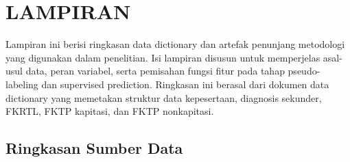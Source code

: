 \cleardoublepage
\appendix
{}

\chapter*{LAMPIRAN}

\setcounter{section}{0}
\setcounter{table}{0}
\setcounter{figure}{0}
\renewcommand{\thesection}{\Alph{section}}
\renewcommand{\thetable}{\thesection.\arabic{table}}
\renewcommand{\thefigure}{\thesection.\arabic{figure}}
\makeatletter
{}
\makeatother

Lampiran ini berisi ringkasan data dictionary dan artefak penunjang metodologi yang digunakan dalam penelitian. Isi lampiran disusun untuk memperjelas asal-usul data, peran variabel, serta pemisahan fungsi fitur pada tahap pseudo-labeling dan supervised prediction. Ringkasan ini berasal dari dokumen data dictionary yang memetakan struktur data kepesertaan, diagnosis sekunder, FKRTL, FKTP kapitasi, dan FKTP nonkapitasi.

\section{Ringkasan Sumber Data}

